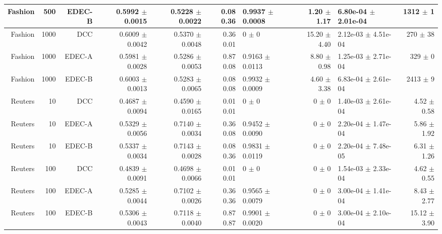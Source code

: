 \begin{table}[ht]
{\begin{tabular}{ | r | r | r | r | r | r | H  r | H  r |}
Fashion & 500 & EDEC-B & { \color{green} 0.5992 $\pm$ 0.0015} & { \color{blue} 0.5228 $\pm$ 0.0022} & { \color{green} 0.08} { \color{green} 0.36} & 0.9937 $\pm$ 0.0008 & 1.20 $\pm$ 1.17 & 6.80e-04 $\pm$ 2.01e-04 & 1312 $\pm$ 1 \\ \hline 
Fashion & 1000 & DCC & { \color{green} 0.6009 $\pm$ 0.0042} & { \color{green} 0.5370 $\pm$ 0.0048} & { \color{green} 0.36} { \color{green} 0.01} & 0 $\pm$ 0 & 15.20 $\pm$ 4.40 & 2.12e-03 $\pm$ 4.51e-04 & 270 $\pm$ 38 \\ 
Fashion & 1000 & EDEC-A & { \color{blue} 0.5981 $\pm$ 0.0028} & { \color{blue} 0.5286 $\pm$ 0.0053} & { \color{green} 0.87} { \color{green} 0.08} & 0.9163 $\pm$ 0.0113 & 8.80 $\pm$ 0.98 & 1.25e-03 $\pm$ 2.71e-04 & 329 $\pm$ 0 \\ 
Fashion & 1000 & EDEC-B & { \color{blue} 0.6003 $\pm$ 0.0013} & { \color{blue} 0.5283 $\pm$ 0.0065} & { \color{green} 0.08} { \color{green} 0.08} & 0.9932 $\pm$ 0.0009 & 4.60 $\pm$ 3.38 & 6.83e-04 $\pm$ 2.61e-04 & 2413 $\pm$ 9 \\ \hline 
Reuters & 10 & DCC & 0.4687 $\pm$ 0.0094 & 0.4590 $\pm$ 0.0165 & { \color{black}0.01} { \color{black}0.01} & 0 $\pm$ 0 & 0 $\pm$ 0 & 1.40e-03 $\pm$ 2.61e-04 & 4.52 $\pm$ 0.58 \\ 
Reuters & 10 & EDEC-A & { \color{blue} 0.5329 $\pm$ 0.0056} & { \color{blue} 0.7140 $\pm$ 0.0034} & { \color{green} 0.36} { \color{green} 0.08} & 0.9452 $\pm$ 0.0090 & 0 $\pm$ 0 & 2.20e-04 $\pm$ 1.47e-04 & 5.86 $\pm$ 1.92 \\ 
Reuters & 10 & EDEC-B & { \color{green} 0.5337 $\pm$ 0.0034} & { \color{green} 0.7143 $\pm$ 0.0028} & { \color{green} 0.08} { \color{green} 0.36} & 0.9831 $\pm$ 0.0119 & 0 $\pm$ 0 & 2.20e-04 $\pm$ 7.48e-05 & 6.31 $\pm$ 1.26 \\ \hline 
Reuters & 100 & DCC & 0.4839 $\pm$ 0.0091 & 0.4698 $\pm$ 0.0066 & { \color{black}0.01} { \color{black}0.01} & 0 $\pm$ 0 & 0 $\pm$ 0 & 1.54e-03 $\pm$ 2.33e-04 & 4.62 $\pm$ 0.55 \\ 
Reuters & 100 & EDEC-A & { \color{blue} 0.5285 $\pm$ 0.0044} & { \color{blue} 0.7102 $\pm$ 0.0026} & { \color{black}0.36} { \color{black}0.36} & 0.9565 $\pm$ 0.0079 & 0 $\pm$ 0 & 3.00e-04 $\pm$ 1.41e-04 & 8.43 $\pm$ 2.77 \\ 
Reuters & 100 & EDEC-B & { \color{green} 0.5306 $\pm$ 0.0043} & { \color{green} 0.7118 $\pm$ 0.0040} & { \color{black}0.87} { \color{black}0.87} & 0.9901 $\pm$ 0.0020 & 0 $\pm$ 0 & 3.00e-04 $\pm$ 2.10e-04 & 15.12 $\pm$ 3.90 \\ \hline 

\end{tabular}}
\end{table}
